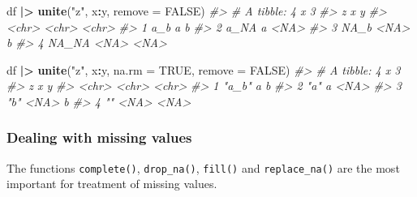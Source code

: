 \documentclass[
]{book}
\newenvironment{Shaded}{\begin{snugshade}}{\end{snugshade}}
\newcommand{\AttributeTok}[1]{\textcolor[rgb]{0.13,0.29,0.53}{#1}}
\newcommand{\CommentTok}[1]{\textcolor[rgb]{0.56,0.35,0.01}{\textit{#1}}}
\newcommand{\ConstantTok}[1]{\textcolor[rgb]{0.56,0.35,0.01}{#1}}
\newcommand{\FunctionTok}[1]{\textcolor[rgb]{0.13,0.29,0.53}{\textbf{#1}}}
\newcommand{\NormalTok}[1]{#1}
\newcommand{\SpecialCharTok}[1]{\textcolor[rgb]{0.81,0.36,0.00}{\textbf{#1}}}
\newcommand{\StringTok}[1]{\textcolor[rgb]{0.31,0.60,0.02}{#1}}
\begin{document}
\begin{Shaded}
\begin{Highlighting}[]
\NormalTok{df }\SpecialCharTok{|\textgreater{}} \FunctionTok{unite}\NormalTok{(}\StringTok{"z"}\NormalTok{, x}\SpecialCharTok{:}\NormalTok{y, }\AttributeTok{remove =} \ConstantTok{FALSE}\NormalTok{)}
\CommentTok{\#\textgreater{} \# A tibble: 4 x 3}
\CommentTok{\#\textgreater{}   z     x     y    }
\CommentTok{\#\textgreater{}   \textless{}chr\textgreater{} \textless{}chr\textgreater{} \textless{}chr\textgreater{}}
\CommentTok{\#\textgreater{} 1 a\_b   a     b    }
\CommentTok{\#\textgreater{} 2 a\_NA  a     \textless{}NA\textgreater{} }
\CommentTok{\#\textgreater{} 3 NA\_b  \textless{}NA\textgreater{}  b    }
\CommentTok{\#\textgreater{} 4 NA\_NA \textless{}NA\textgreater{}  \textless{}NA\textgreater{}}

\NormalTok{df }\SpecialCharTok{|\textgreater{}} \FunctionTok{unite}\NormalTok{(}\StringTok{"z"}\NormalTok{, x}\SpecialCharTok{:}\NormalTok{y, }\AttributeTok{na.rm =} \ConstantTok{TRUE}\NormalTok{, }\AttributeTok{remove =} \ConstantTok{FALSE}\NormalTok{)}
\CommentTok{\#\textgreater{} \# A tibble: 4 x 3}
\CommentTok{\#\textgreater{}   z     x     y    }
\CommentTok{\#\textgreater{}   \textless{}chr\textgreater{} \textless{}chr\textgreater{} \textless{}chr\textgreater{}}
\CommentTok{\#\textgreater{} 1 "a\_b" a     b    }
\CommentTok{\#\textgreater{} 2 "a"   a     \textless{}NA\textgreater{} }
\CommentTok{\#\textgreater{} 3 "b"   \textless{}NA\textgreater{}  b    }
\CommentTok{\#\textgreater{} 4 ""    \textless{}NA\textgreater{}  \textless{}NA\textgreater{}}
\end{Highlighting}
\end{Shaded}

\subsubsection{Dealing with missing values}\label{dealing-with-missing-values}

The functions \texttt{complete()}, \texttt{drop\_na()}, \texttt{fill()} and \texttt{replace\_na()} are the most important for treatment of missing values.
\end{document}

